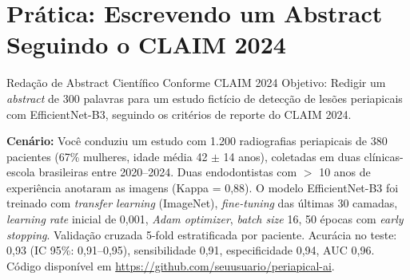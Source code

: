 
\section{Prática: Escrevendo um Abstract Seguindo o CLAIM 2024}
\label{sec:pratica-abstract}

\nivelcinco

\begin{pratica}{Redação de Abstract Científico Conforme CLAIM 2024}
  Objetivo: Redigir um \textit{abstract} de 300 palavras para um estudo
  fictício de detecção de lesões periapicais com EfficientNet-B3, seguindo os
  critérios de reporte do CLAIM 2024.

  \textbf{Cenário:} Você conduziu um estudo com 1.200 radiografias periapicais
  de 380 pacientes (67\% mulheres, idade média 42 $\pm$ 14 anos), coletadas em
  duas clínicas-escola brasileiras entre 2020--2024. Duas endodontistas com $>$
  10 anos de experiência anotaram as imagens (Kappa = 0,88). O modelo
  EfficientNet-B3 foi treinado com \textit{transfer learning} (ImageNet),
  \textit{fine-tuning} das últimas 30 camadas, \textit{learning rate} inicial
  de 0,001, \textit{Adam optimizer}, \textit{batch size} 16, 50 épocas com
  \textit{early stopping}. Validação cruzada 5-fold estratificada por paciente.
  Acurácia no teste: 0,93 (IC 95\%: 0,91--0,95), sensibilidade 0,91,
  especificidade 0,94, AUC 0,96. Código disponível em
  \url{https://github.com/seuusuario/periapical-ai}.
\end{pratica}

